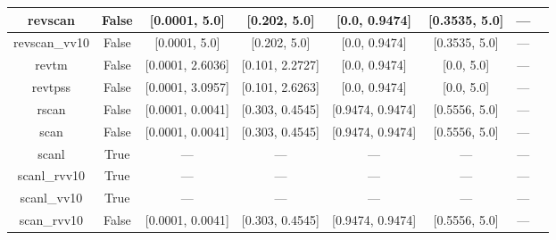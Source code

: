 \begin{tabular}{|c|c|c|c|c|c|c|l|}
      revscan &                 False &    [0.0001, 5.0] &     [0.202, 5.0] &    [0.0, 0.9474] &  [0.3535, 5.0] &        --- &                                                              \cite{Mezei2018_2469} \\ \hline
revscan\_vv10 &                 False &    [0.0001, 5.0] &     [0.202, 5.0] &    [0.0, 0.9474] &  [0.3535, 5.0] &        --- &                                                              \cite{Mezei2018_2469} \\ \hline
        revtm &                 False & [0.0001, 2.6036] &  [0.101, 2.2727] &    [0.0, 0.9474] &     [0.0, 5.0] &        --- &                                                               \cite{Jana2019_6356} \\ \hline
      revtpss &                 False & [0.0001, 3.0957] &  [0.101, 2.6263] &    [0.0, 0.9474] &     [0.0, 5.0] &        --- &                                     \cite{Perdew2009_026403,Perdew2009_026403_err} \\ \hline
        rscan &                 False & [0.0001, 0.0041] &  [0.303, 0.4545] & [0.9474, 0.9474] &  [0.5556, 5.0] &        --- &                                                           \cite{Bartok2019_161101} \\ \hline
         scan &                 False & [0.0001, 0.0041] &  [0.303, 0.4545] & [0.9474, 0.9474] &  [0.5556, 5.0] &        --- &                                                              \cite{Sun2015_036402} \\ \hline
        scanl &                  True &              --- &              --- &              --- &            --- &        --- &                            \cite{Mejia2017_052512,Mejia2018_115161,Sun2015_036402} \\ \hline
 scanl\_rvv10 &                  True &              --- &              --- &              --- &            --- &        --- &                           \cite{Mejia2017_052512,Mejia2018_115161,Peng2016_041005} \\ \hline
  scanl\_vv10 &                  True &              --- &              --- &              --- &            --- &        --- &                    \cite{Mejia2017_052512,Mejia2018_115161,Brandenburg2016_115144} \\ \hline
  scan\_rvv10 &                 False & [0.0001, 0.0041] &  [0.303, 0.4545] & [0.9474, 0.9474] &  [0.5556, 5.0] &        --- &                                                             \cite{Peng2016_041005} \\ \hline

\end{tabular}
